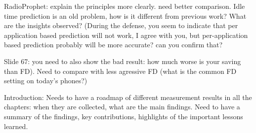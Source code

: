{RadioProphet:  explain the principles more clearly.  need better comparison.
Idle time prediction is an old problem, how is it different from previous work?
What are the insights observed?
(During the defense, you seem to indicate that per application based prediction will not work, I agree with you, but per-application based prediction probably will be more accurate?  can you confirm that?

Slide 67: you need to also show the bad result: how much worse is your saving than FD).
Need to compare with less agressive FD (what is the common FD setting on today's phones?)

Introduction:
Needs to have a roadmap of different measurement results in all the chapters: when they are collected, what are the main findings.
Need to have a summary of the findings, key contributions, highlights of the important lessons learned.


}

\label{Abstract}

